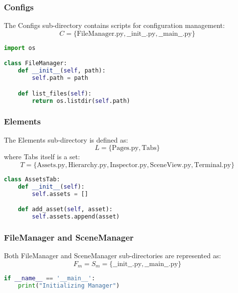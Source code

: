 
\subsubsection*{Configs}
The Configs sub-directory contains scripts for configuration management:
\[
C = \{\text{FileManager.py}, \text{\_\_init\_\_.py}, \text{\_\_main\_\_.py}\}
\]

\begin{lstlisting}[language=Python, caption=FileManager.py]
import os

class FileManager:
    def __init__(self, path):
        self.path = path

    def list_files(self):
        return os.listdir(self.path)
\end{lstlisting}

\subsubsection*{Elements}
The Elements sub-directory is defined as:
\[
L = \{\text{Pages.py}, \text{Tabs}\}
\]
where Tabs itself is a set:
\[
T = \{\text{Assets.py}, \text{Hierarchy.py}, \text{Inspector.py}, \text{SceneView.py}, \text{Terminal.py}\}
\]

\begin{lstlisting}[language=Python, caption=Assets.py]
class AssetsTab:
    def __init__(self):
        self.assets = []

    def add_asset(self, asset):
        self.assets.append(asset)
\end{lstlisting}

\subsubsection*{FileManager and SceneManager}
Both FileManager and SceneManager sub-directories are represented as:
\[
F_m = S_m = \{\text{\_\_init\_\_.py}, \text{\_\_main\_\_.py}\}
\]

\begin{lstlisting}[language=Python, caption=__main__.py]
if __name__ == '__main__':
    print("Initializing Manager")
\end{lstlisting}

